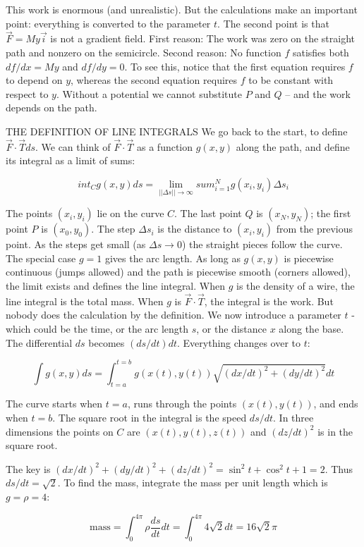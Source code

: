 This work is enormous (and unrealistic). But the calculations make an important
point: everything is converted to the parameter $t$. The second point is that $\vec F = My \vec i$
is not a gradient field. First reason: The work was zero on the straight path and 
nonzero on the semicircle. Second reason: No function $f$ satisfies both $df/ dx = My$ and $df /dy =
0$. To see this, notice that the first equation requires $f$ to depend on $y$, whereas the second equation requires $f$ to be constant with respect to $y$. Without a potential we cannot substitute $P$ and $Q$ -- and the work depends
on the path.

THE DEFINITION OF LINE INTEGRALS
We go back to the start, to define $\vec F \cdot \vec T ds$. We can think of $\vec F \cdot \vec T$ as a function $g(x, y)$
along the path, and define its integral as a limit of sums:

\begin{definition}
 $$int_C g(x,y)ds = \lim_{||\Delta s||\to\infty} sum_{i=1}^N g(x_i,y_i)\Delta s_i$$
\end{definition}

The points $(x_i, y_i)$ lie on the curve $C$. The last point $Q$ is $(x_N, y_N)$; the first point $P$ is
$(x_0, y_0)$. The step $\Delta s_i$ is the distance to $(x_i, y_i)$ from the previous point. As the steps
get small (as $\Delta s \to 0$) the straight pieces follow the curve. The
special case $g = 1$ gives the arc length. As long as $g(x, y)$ is piecewise continuous
(jumps allowed) and the path is piecewise smooth (corners allowed), the limit exists
and defines the line integral.
When $g$ is the density of a wire, the line integral is the total mass. When $g$ is $\vec F \cdot \vec T$,
the integral is the work. But nobody does the calculation by the definition. We now
introduce a parameter $t$ - which could be the time, or the arc length $s$, or the distance
$x$ along the base.
The differential $ds$ becomes $(ds/dt)dt$. Everything changes over to $t$:

$$\int g(x,y)ds=\int_{t=a}^{t=b}g(x(t),y(t))\sqrt{(dx/dt)^2+(dy/dt)^2}dt$$

The curve starts when $t = a$, runs through the points $(x(t), y(t))$, and ends when $t = b$.
The square root in the integral is the speed $ds/dt$. In three dimensions the points on
$C$ are $(x(t), y(t), z(t))$ and $(dz/dt)^2$ is in the square root.

{The key is $(dx/dt)^2 + (dy/dt)^2 + (dz/dt)^2 = \sin^2 t + \cos^2 t + 1 = 2$. Thus
$ds/dt = \sqrt{2}$. To find the mass, integrate the mass per unit length which is $g = \rho = 4$:

$$\text{mass}=\int_0^{4\pi}\rho \dfrac{ds}{dt}dt=\int_0^{4\pi}4\sqrt{2}dt=16\sqrt{2}\pi$$}


